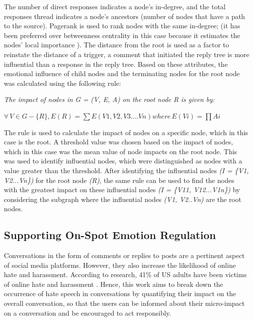 \documentclass[acmtog]{acmart}
\begin{document}
The number of direct responses indicates a node's in-degree, and the total responses thread indicates a node's ancestors (number of nodes that have a path to the source). Pagerank is used to rank nodes with the same in-degree; (it has been preferred over betweenness centrality in this case because it estimates the nodes' local importance \cite{antonakaki2021survey}). The distance from the root is used as a factor to reinstate the distance of a trigger, a comment that initiated the reply tree is more influential than a response in the reply tree. Based on these attributes, the emotional influence of child nodes and the terminating nodes for the root node was calculated using the following rule: 
    

\textit{The impact of nodes in G = (V, E, A) on the root node R is given by:}

% 
$\forall \,V \in G-\{R\},
E(R) = \sum{E(V1, V2, V3....Vn)}
where \,E(Vi) =\prod{Ai}$

The rule is used to calculate the impact of nodes on a specific node, which in this case is the root. A threshold value was chosen based on the impact of nodes, which in this case was the mean value of node impacts on the root node. This was used to identify influential nodes, which were distinguished as nodes with a value greater than the threshold. After identifying the influential nodes \textit{(I = \{V1, V2...Vn\})} for the root node \textit{(R)}, the same rule can be used to find the nodes with the greatest impact on these influential nodes  \textit{(I = \{V11, V12...V1n\})} by considering the subgraph where the influential nodes \textit{(V1, V2..Vn)} are the root nodes.



\subsection{Supporting On-Spot Emotion Regulation}
Conversations in the form of comments or replies to posts are a pertinent aspect of social media platforms. However, they also increase the likelihood of online hate and harassment. According to research, 41\% of US adults have been victims of online hate and harassment \cite{thomas2022s}. Hence, this work aims to break down the occurrence of hate speech in conversations by quantifying their impact on the overall conversation, so that the users can be informed about their micro-impact on a conversation and be encouraged to act responsibly.
\end{document}

